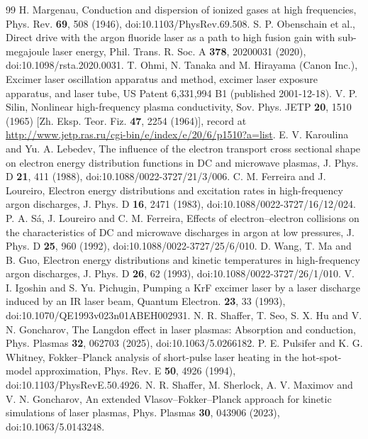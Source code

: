 \documentclass[11pt]{article}
\numberwithin{equation}{section}
\begin{document}
\begin{thebibliography}{99}
 H. Margenau, Conduction and dispersion of ionized gases at
high frequencies, Phys. Rev. \textbf{69}, 508 (1946), doi:10.1103/PhysRev.69.508.
 S. P. Obenschain et al., Direct drive with the argon
fluoride laser as a path to high fusion gain with sub-megajoule laser energy,
Phil. Trans. R. Soc. A \textbf{378}, 20200031 (2020), doi:10.1098/rsta.2020.0031.
 T. Ohmi, N. Tanaka and M. Hirayama (Canon Inc.), Excimer laser
oscillation apparatus and method, excimer laser exposure apparatus, and laser tube,
US Patent 6,331,994 B1 (published 2001-12-18).
 V. P. Silin, Nonlinear high-frequency plasma conductivity,
Sov. Phys. JETP \textbf{20}, 1510 (1965) [Zh. Eksp. Teor. Fiz. \textbf{47}, 2254
(1964)], record at \url{http://www.jetp.ras.ru/cgi-bin/e/index/e/20/6/p1510?a=list}.
 E. V. Karoulina and Yu. A. Lebedev, The influence of the
electron transport cross sectional shape on electron energy distribution functions in
DC and microwave plasmas, J. Phys. D \textbf{21}, 411 (1988),
doi:10.1088/0022-3727/21/3/006.
 C. M. Ferreira and J. Loureiro, Electron energy
distributions and excitation rates in high-frequency argon discharges, J. Phys. D
\textbf{16}, 2471 (1983), doi:10.1088/0022-3727/16/12/024.
 P. A. S\'a, J. Loureiro and C. M. Ferreira, Effects of
electron--electron collisions on the characteristics of DC and microwave discharges
in argon at low pressures, J. Phys. D \textbf{25}, 960 (1992),
doi:10.1088/0022-3727/25/6/010.
 D. Wang, T. Ma and B. Guo, Electron energy distributions and
kinetic temperatures in high-frequency argon discharges, J. Phys. D \textbf{26}, 62
(1993), doi:10.1088/0022-3727/26/1/010.
 V. I. Igoshin and S. Yu. Pichugin, Pumping a KrF excimer laser
by a laser discharge induced by an IR laser beam, Quantum Electron. \textbf{23}, 33
(1993), doi:10.1070/QE1993v023n01ABEH002931.
 N. R. Shaffer, T. Seo, S. X. Hu and V. N. Goncharov, The
Langdon effect in laser plasmas: Absorption and conduction, Phys. Plasmas
\textbf{32}, 062703 (2025), doi:10.1063/5.0266182.
 P. E. Pulsifer and K. G. Whitney, Fokker--Planck analysis of
short-pulse laser heating in the hot-spot-model approximation, Phys. Rev. E
\textbf{50}, 4926 (1994), doi:10.1103/PhysRevE.50.4926.
 N. R. Shaffer, M. Sherlock, A. V. Maximov and V. N. Goncharov,
An extended Vlasov--Fokker--Planck approach for kinetic simulations of laser plasmas,
Phys. Plasmas \textbf{30}, 043906 (2023), doi:10.1063/5.0143248.

\end{thebibliography}
\end{document}

